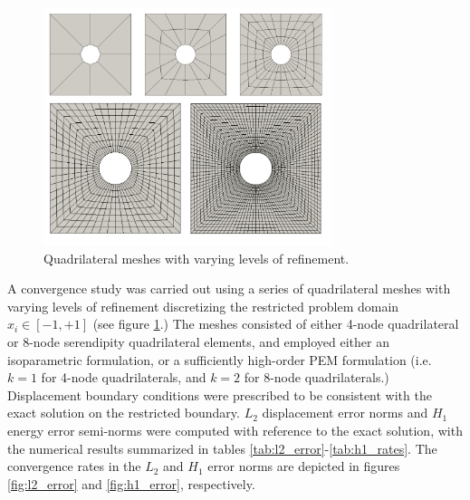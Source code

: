 \documentclass[12pt]{article}
\begin{document}
\begin{figure}[!h]
  \centering
  \includegraphics[width=0.75\textwidth]{plate_with_hole_meshes.png}
  \caption{Quadrilateral meshes with varying levels of refinement.}
  \label{fig:plate_with_hole_meshes}
\end{figure}
A convergence study was carried out using a series of quadrilateral meshes with varying levels of refinement discretizing the restricted problem domain $x_i \in [ -1, +1]$ (see figure \ref{fig:plate_with_hole_meshes}.) The meshes consisted of either 4-node quadrilateral or 8-node serendipity quadrilateral elements, and employed either an isoparametric formulation, or a sufficiently high-order PEM formulation (i.e. $k=1$ for 4-node quadrilaterals, and $k=2$ for 8-node quadrilaterals.) Displacement boundary conditions were prescribed to be consistent with the exact solution on the restricted boundary. $L_2$ displacement error norms and $H_1$ energy error semi-norms were computed with reference to the exact solution, with the numerical results summarized in tables \ref{tab:l2_error}-\ref{tab:h1_rates}. The convergence rates in the $L_2$ and $H_1$ error norms are depicted in figures \ref{fig:l2_error} and \ref{fig:h1_error}, respectively.
\newpage
\end{document}
